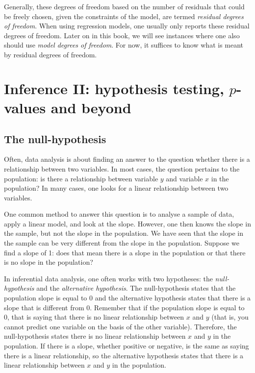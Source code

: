 \documentclass[]{report}\usepackage[]{graphicx}\usepackage[]{color}
\begin{document}
Generally, these degrees of freedom based on the number of residuals that could be freely chosen, given the constraints of the model, are termed \textit{residual degrees of freedom}. When using regression models, one usually only reports these residual degrees of freedom. Later on in this book, we will see instances where one also should use \textit{model degrees of freedom}. For now, it suffices to know what is meant by residual degrees of freedom.





\chapter{Inference II: hypothesis testing, $p$-values and beyond}\label{chap:hypothesis}

\section{The null-hypothesis}

Often, data analysis is about finding an answer to the question whether there is a relationship between two variables. In most cases, the question pertains to the population: is there a relationship between variable $y$ and variable $x$ in the population? In many cases, one looks for a linear relationship between two variables.

One common method to answer this question is to analyse a sample of data, apply a linear model, and look at the slope. However, one then knows the slope in the sample, but not the slope in the population. We have seen that the slope in the sample can be very different from the slope in the population. Suppose we find a slope of 1: does that mean there is a slope in the population or that there is no slope in the population?

In inferential data analysis, one often works with two hypotheses: the \textit{null-hypothesis} and the \textit{alternative hypothesis}. The null-hypothesis states that the population slope is equal to 0 and the alternative hypothesis states that there is a slope that is different from 0. Remember that if the population slope is equal to 0, that is saying that there is no linear relationship between $x$ and $y$ (that is, you cannot predict one variable on the basis of the other variable). Therefore, the null-hypothesis states there is no linear relationship between $x$ and $y$ in the population. If there is a slope, whether positive or negative, is the same as saying there is a linear relationship, so the alternative hypothesis states that there is a linear relationship between $x$ and $y$ in the population.
\end{document}
